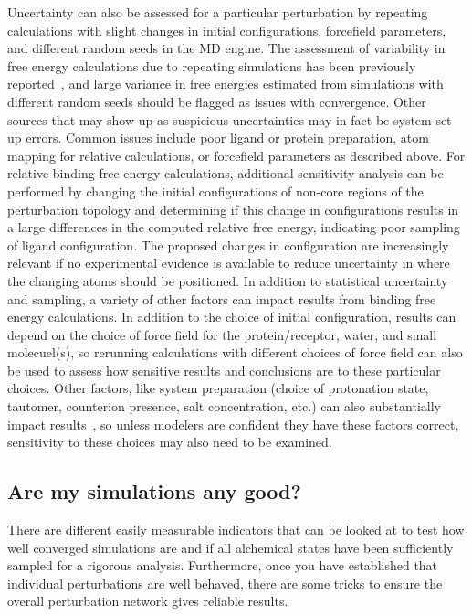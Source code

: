 \documentclass[9pt,bestpractices]{livecoms}
\begin{document}
%
Uncertainty can also be assessed for a particular perturbation by repeating calculations with slight changes in initial configurations, forcefield parameters, and different random seeds in the MD engine. 
The assessment of variability in free energy calculations due to repeating simulations has been previously reported~\cite{aldeghi2019accurate,paliwal2011benchmark,mey2016blinded,mey2018impact}, and large variance in free energies estimated from simulations with different random seeds should be flagged as issues with convergence. 
Other sources that may show up as suspicious uncertainties may in fact be system set up errors. Common issues include poor ligand or protein preparation, atom mapping for relative calculations, or forcefield parameters as described above.
%
For relative binding free energy calculations, additional sensitivity analysis can be performed by changing the initial configurations of non-core regions of the perturbation topology and determining if this change in configurations results in a large differences in the computed relative free energy, indicating poor sampling of ligand configuration.
The proposed changes in configuration are increasingly relevant if no experimental evidence is available to reduce uncertainty in where the changing atoms should be positioned.
%
In addition to statistical uncertainty and sampling, a variety of other factors can impact results from binding free energy calculations. In addition to the choice of initial configuration, results can depend on the choice of force field for the protein/receptor, water, and small molecuel(s), so rerunning calculations with different choices of force field can also be used to assess how sensitive results and conclusions are to these particular choices. Other factors, like system preparation (choice of protonation state, tautomer, counterion presence, salt concentration, etc.) can also substantially impact results~\cite{mobley2017predicting, mobley2017predictingb}, so unless modelers are confident they have these factors correct, sensitivity to these choices may also need to be examined.
%
\subsection{Are my simulations any good?}
\label{sec:are-they-good}
There are different easily measurable indicators that can be looked at to test how well converged simulations are and if all alchemical states have been sufficiently sampled for a rigorous analysis. Furthermore, once you have established that individual perturbations are well behaved, there are some tricks to ensure the overall perturbation network gives reliable results.
%
\end{document}

